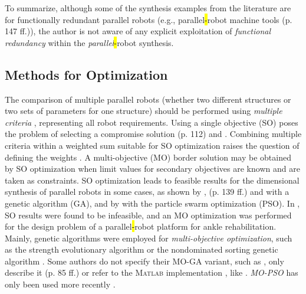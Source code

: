 To summarize, although some of the synthesis examples from the literature are for functionally redundant parallel robots (e.g., parallel\hl{-}robot machine tools \cite{Zhang2009} (p. 147 ff.)), the author is not aware of any explicit exploitation of \emph{functional redundancy} within the \emph{parallel}\hl{-}robot synthesis.

%
\subsection{Methods for Optimization}
\label{sec:ds_soa_optim}
%


The comparison of multiple parallel robots (whether two different structures or two sets of parameters for one structure) should be performed using \emph{multiple criteria} \cite{Merlet2006}, representing all robot requirements.
Using a single objective (SO) poses the problem of selecting a compromise solution \cite{Krefft2006} (p. 112) and \cite{JamwalHusXie2015}.
Combining multiple criteria within a weighted sum suitable for SO optimization raises the question of defining the weights \cite{VulliezZegKha2018}.
A multi-objective (MO) border solution may be obtained by SO optimization when limit values for secondary objectives are known and are taken as constraints. SO optimization leads to feasible results for the dimensional synthesis of parallel robots in some cases, as shown by \cite{SuDuaZhe2001}, \cite{Zhang2009} (p. 139 ff.) and \cite{Prause2016} %
%
with a genetic algorithm (GA), and by \cite{XuLi2009,YunLi2011,WangZhaCheHua2017} with the particle swarm optimization (PSO). %
In \cite{JamwalHusXie2015}, SO results were found to be infeasible, and an MO optimization was performed for the design problem of a parallel\hl{-}robot platform for ankle rehabilitation.
Mainly, genetic algorithms were employed for \emph{multi-objective optimization}, such as the strength  evolutionary algorithm \cite{Krefft2006,KelaiaiaComZaa2012} or the nondominated sorting genetic algorithm \cite{LaraMolinaRosDum2010,JamwalHusXie2015}.
Some authors do not specify their MO-GA variant, such as \cite{VulliezZegKha2018}, only describe it \cite{Kirchner2000} (p. 85 ff.) or refer to the \textsc{Matlab} implementation \cite{MatlabGOT}, like \cite{BenHamidaLarMliRom2021}.
\emph{MO-PSO} has only been used more recently \cite{WangZha2017,SunLia2018,QiSunSon2018,LianWanWan2019}. %
%


